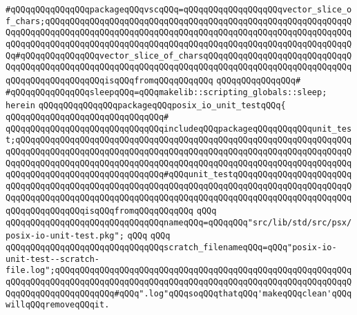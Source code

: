 \verb|#qQQqqQQqqQQqqQQqpackageqQQqvscqQQq=qQQqqQQqqQQqqQQqqQQqvector_slice_of_chars;qQQqqQQqqQQqqQQqqQQqqQQqqQQqqQQqqQQqqQQqqQQqqQQqqQQqqQQqqQQqqQQqqQQqqQQqqQQqqQQqqQQqqQQqqQQqqQQqqQQqqQQqqQQqqQQqqQQqqQQqqQQqqQQqqQQqqQQqqQQqqQQqqQQqqQQqqQQqqQQqqQQqqQQqqQQqqQQqqQQqqQQqqQQqqQQqqQQqqQQqqQQq#qQQqqQQqqQQqqQQqvector_slice_of_charsqQQqqQQqqQQqqQQqqQQqqQQqqQQqqQQqqQQqqQQqqQQqqQQqqQQqqQQqqQQqqQQqqQQqqQQqqQQqqQQqqQQqqQQqqQQqqQQqqQQqqQQqqQQqqQQqqQQqqQQqisqQQqfromqQQqqQQqqQQq|\newline
\verb|qQQqqQQqqQQqqQQq#|\newline
\verb|#qQQqqQQqqQQqqQQqsleepqQQq=qQQqmakelib::scripting_globals::sleep;|\newline
\newline
\verb|herein|\newline
\newline
\verb|qQQqqQQqqQQqqQQqpackageqQQqposix_io_unit_testqQQq{|\newline
\verb|qQQqqQQqqQQqqQQqqQQqqQQqqQQqqQQq#|\newline
\verb|qQQqqQQqqQQqqQQqqQQqqQQqqQQqqQQqincludeqQQqpackageqQQqqQQqqQQqunit_test;qQQqqQQqqQQqqQQqqQQqqQQqqQQqqQQqqQQqqQQqqQQqqQQqqQQqqQQqqQQqqQQqqQQqqQQqqQQqqQQqqQQqqQQqqQQqqQQqqQQqqQQqqQQqqQQqqQQqqQQqqQQqqQQqqQQqqQQqqQQqqQQqqQQqqQQqqQQqqQQqqQQqqQQqqQQqqQQqqQQqqQQqqQQqqQQqqQQqqQQqqQQqqQQqqQQqqQQqqQQqqQQqqQQqqQQqqQQqqQQq#qQQqunit_testqQQqqQQqqQQqqQQqqQQqqQQqqQQqqQQqqQQqqQQqqQQqqQQqqQQqqQQqqQQqqQQqqQQqqQQqqQQqqQQqqQQqqQQqqQQqqQQqqQQqqQQqqQQqqQQqqQQqqQQqqQQqqQQqqQQqqQQqqQQqqQQqqQQqqQQqqQQqqQQqqQQqqQQqqQQqqQQqqQQqisqQQqfromqQQqqQQqqQQq|\newline
\verb|qQQq|\newline
\verb|qQQqqQQqqQQqqQQqqQQqqQQqqQQqqQQqnameqQQq=qQQqqQQq"src/lib/std/src/psx/posix-io-unit-test.pkg";|\newline
\verb|qQQq|\newline
\verb|qQQq|\newline
\verb|qQQqqQQqqQQqqQQqqQQqqQQqqQQqqQQqscratch_filenameqQQq=qQQq"posix-io-unit-test--scratch-file.log";qQQqqQQqqQQqqQQqqQQqqQQqqQQqqQQqqQQqqQQqqQQqqQQqqQQqqQQqqQQqqQQqqQQqqQQqqQQqqQQqqQQqqQQqqQQqqQQqqQQqqQQqqQQqqQQqqQQqqQQqqQQqqQQqqQQqqQQqqQQqqQQqqQQqqQQq#qQQq".log"qQQqsoqQQqthatqQQq'makeqQQqclean'qQQqwillqQQqremoveqQQqit.|\newline
\newline
\newline
